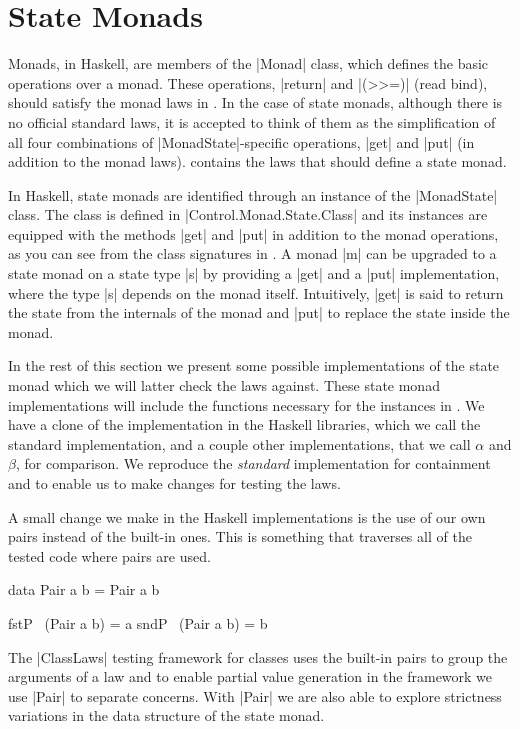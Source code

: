 
\section{State Monads}
\label{sec:stm}


Monads, in Haskell, are members of the |Monad| class, which defines
the basic operations over a monad.
%
These operations, |return| and |(>>=)| (read bind), should satisfy the
monad laws in .
%
In the case of state monads, although there is no official standard
laws, it is accepted to think of them as the simplification of all four
combinations of |MonadState|-specific operations, |get| and |put| (in
addition to the monad laws).
%
 contains the laws that should define a state
monad.


In Haskell, state monads are identified through an instance of the
|MonadState| class.
%
The class is defined in |Control.Monad.State.Class| and its instances
are equipped with the methods |get| and |put| in addition to the monad
operations, as you can see from the class signatures in
.
%
A monad |m| can be upgraded to a state monad on a state type |s| by
providing a |get| and a |put| implementation, where the type |s|
depends on the monad itself.
%
Intuitively, |get| is said to return the state from the internals of
the monad and |put| to replace the state inside the monad.



In the rest of this section we present some possible implementations
of the state monad which we will latter check the laws against.
%
These state monad implementations will include the functions necessary
for the instances in .
%
We have a clone of the implementation in the Haskell libraries, which
we call the standard implementation, and a couple other
implementations, that we call $\alpha$ and $\beta$, for comparison.
%
We reproduce the \emph{standard} implementation for containment and to
enable us to make changes for testing the laws.


A small change we make in the Haskell implementations is the use of
our own pairs instead of the built-in ones.
%
This is something that traverses all of the tested code where pairs
are used.
\begin{code}
data Pair a b = Pair a b

fstP ~(Pair a b) = a
sndP ~(Pair a b) = b
\end{code} %
%
The |ClassLaws| testing framework for classes uses the built-in pairs to
group the arguments of a law and to enable partial value generation in
the framework we use |Pair| to separate concerns.
%
With |Pair| we are also able to explore strictness variations in the
data structure of the state monad.

